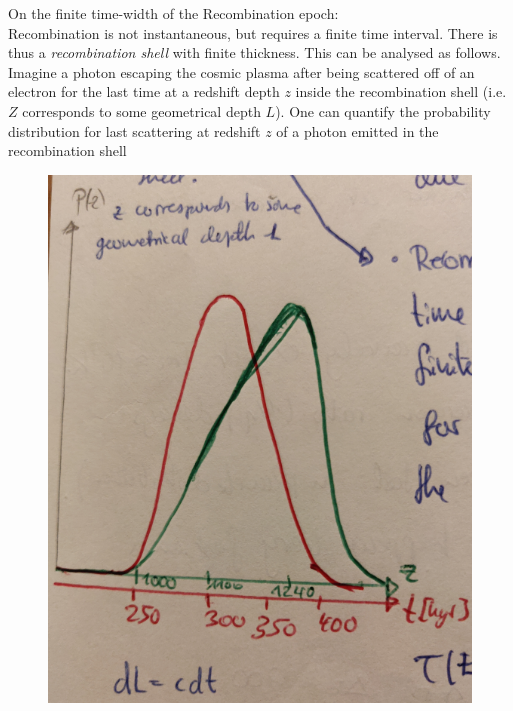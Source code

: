 On the finite time-width of the Recombination epoch:\\
Recombination is not instantaneous, but requires a finite time interval. There is thus a \emph{recombination shell} with finite thickness. This can be analysed as follows. Imagine a photon escaping the cosmic plasma after being scattered off of an electron for the last time at a redshift depth $z$ inside the recombination shell (i.e. $Z$ corresponds to some geometrical depth $L$). One can quantify the probability distribution for last scattering at redshift $z$ of a photon emitted in the recombination shell
\begin{figure}[h!]
	\centering
	\includegraphics[width=0.5\linewidth]{gfx/RecombinationShell1}
	\caption{}
	\label{fig:recombinationshell1}
\end{figure}


